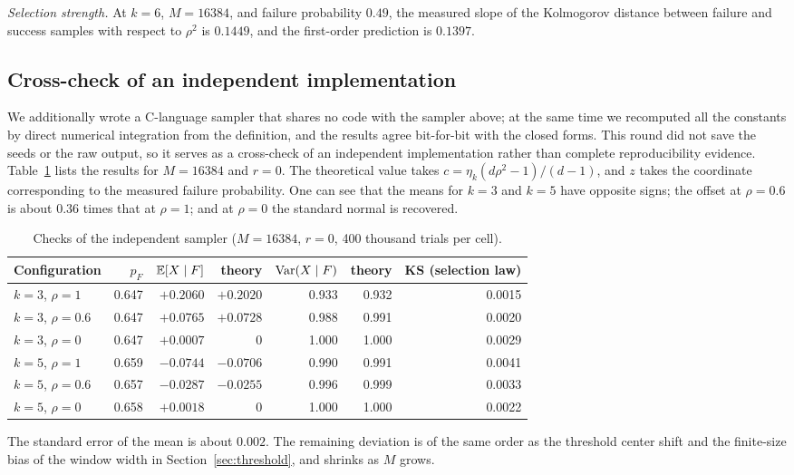\emph{Selection strength.} At $k=6$, $M=16384$, and failure probability $0.49$, the measured slope of the Kolmogorov
distance between failure and success samples with respect to $\rho^2$ is $0.1449$, and the first-order prediction is
$0.1397$.

\subsection{Cross-check of an independent implementation}\label{app:exp-indep}
We additionally wrote a C-language sampler that shares no code with the sampler above; at the same time we recomputed
all the constants by direct numerical integration from the definition, and the results agree bit-for-bit with the
closed forms. This round did not save the seeds or the raw output, so it serves as a cross-check of an independent
implementation rather than complete reproducibility evidence. Table~\ref{tab:indep} lists the results for $M=16384$
and $r=0$. The theoretical value takes $c=\eta_k(d\rho^2-1)/(d-1)$, and $z$ takes the coordinate corresponding to the
measured failure probability. One can see that the means for $k=3$ and $k=5$ have opposite signs; the offset at
$\rho=0.6$ is about $0.36$ times that at $\rho=1$; and at $\rho=0$ the standard normal is recovered.
\begin{table}[!htbp]
\centering
\caption{Checks of the independent sampler ($M=16384$, $r=0$, 400 thousand trials per cell).}
\label{tab:indep}
\begin{tabular}{lrrrrrr}
\toprule
Configuration & $p_F$ & $\mathbb E[X\mid F]$ & theory & $\operatorname{Var}(X\mid F)$ & theory & KS (selection law)\\
\midrule
$k=3$, $\rho=1$ & 0.647 & $+0.2060$ & $+0.2020$ & 0.933 & 0.932 & 0.0015\\
$k=3$, $\rho=0.6$ & 0.647 & $+0.0765$ & $+0.0728$ & 0.988 & 0.991 & 0.0020\\
$k=3$, $\rho=0$ & 0.647 & $+0.0007$ & $0$ & 1.000 & 1.000 & 0.0029\\
$k=5$, $\rho=1$ & 0.659 & $-0.0744$ & $-0.0706$ & 0.990 & 0.991 & 0.0041\\
$k=5$, $\rho=0.6$ & 0.657 & $-0.0287$ & $-0.0255$ & 0.996 & 0.999 & 0.0033\\
$k=5$, $\rho=0$ & 0.658 & $+0.0018$ & $0$ & 1.000 & 1.000 & 0.0022\\
\bottomrule
\end{tabular}
\end{table}
The standard error of the mean is about $0.002$. The remaining deviation is of the same order as the threshold center
shift and the finite-size bias of the window width in Section~\ref{sec:threshold}, and shrinks as $M$ grows.
